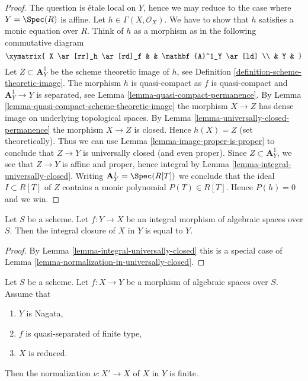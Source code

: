 \begin{proof}
The question is \'etale local on $Y$, hence we may reduce to the
case where $Y = \Spec(R)$ is affine. Let $h \in \Gamma(X, \mathcal{O}_X)$.
We have to show that $h$ satisfies a monic equation over $R$. Think of $h$
as a morphism as in the following commutative diagram
$$
\xymatrix{
X \ar[rr]_h \ar[rd]_f & & \mathbf{A}^1_Y \ar[ld] \\
& Y &
}
$$
Let $Z \subset \mathbf{A}^1_Y$ be the scheme theoretic image of $h$,
see Definition \ref{definition-scheme-theoretic-image}.
The morphism $h$ is quasi-compact as $f$ is quasi-compact and
$\mathbf{A}^1_Y \to Y$ is separated, see
Lemma \ref{lemma-quasi-compact-permanence}.
By Lemma \ref{lemma-quasi-compact-scheme-theoretic-image} the
morphism $X \to Z$ has dense image on underlying topological spaces. By
Lemma \ref{lemma-universally-closed-permanence} the morphism
$X \to Z$ is closed. Hence $h(X) = Z$ (set theoretically).
Thus we can use
Lemma \ref{lemma-image-proper-is-proper}
to conclude that $Z \to Y$ is universally closed (and even proper).
Since $Z \subset \mathbf{A}^1_Y$, we see that $Z \to Y$ is affine
and proper, hence integral by Lemma \ref{lemma-integral-universally-closed}.
Writing $\mathbf{A}^1_Y = \Spec(R[T])$ we conclude that
the ideal $I \subset R[T]$ of $Z$ contains a monic polynomial
$P(T) \in R[T]$. Hence $P(h) = 0$ and we win.
\end{proof}

\begin{lemma}
\label{lemma-normalization-in-integral}
Let $S$ be a scheme. Let $f : Y \to X$ be an integral morphism
of algebraic spaces over $S$.
Then the integral closure of $X$ in $Y$ is equal to $Y$.
\end{lemma}

\begin{proof}
By Lemma \ref{lemma-integral-universally-closed} this is a special case of
Lemma \ref{lemma-normalization-in-universally-closed}.
\end{proof}

\begin{lemma}
\label{lemma-nagata-normalization-finite}
Let $S$ be a scheme. Let $f : X \to Y$ be a morphism of algebraic spaces
over $S$. Assume that
\begin{enumerate}
\item $Y$ is Nagata,
\item $f$ is quasi-separated of finite type,
\item $X$ is reduced.
\end{enumerate}
Then the normalization $\nu : X' \to X$ of $X$ in $Y$ is finite.
\end{lemma}

